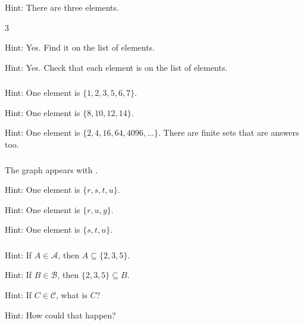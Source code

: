 \subsubsection*{ \answers}
\begin{apart}
    \item Hint: There are three elements.
    \item 3
    \item Hint: Yes.  Find it on the list of elements.
    \item Hint: Yes.  Check that each element is on the list of elements.
\end{apart}

\subsubsection*{ \answers}
\begin{apart}
    \item Hint: One element is $\{1,2,3,5,6,7\}$. 
    \item Hint: One element is $\{8,10,12,14\}$.
    \item Hint: One element is $\{2,4,16,64,4096, \ldots\}$.  There are finite sets that are answers too.
\end{apart}

\subsubsection*{ \answers}
The graph appears with  .
\begin{apart}
    \item Hint: One element is $\{r,s,t,u\}$.
    \item Hint: One element is $\{r, u, y\}$.
    \item Hint: One element is $\{s,t,u\}$.
\end{apart}

\subsubsection*{ \answers}
\begin{apart}
    \item Hint: If $A \in \mathscr{A}$, then $A \subseteq \{2,3,5\}$.
    \item Hint: If $B \in \mathscr{B}$, then $\{2,3,5\} \subseteq B$.
    \item Hint: If $C \in \mathscr{C}$, what is $C$?
    \item Hint: How could that happen?
\end{apart}

